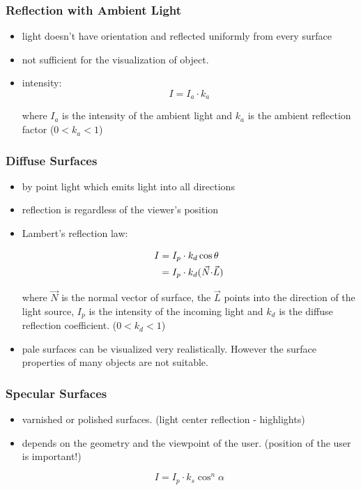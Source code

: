 \documentclass{standalone}
\begin{document}
\subsubsection*{Reflection with Ambient Light}

\begin{itemize}
	\item light doesn't have orientation and reflected uniformly from every surface
	\item not sufficient for the visualization of object.
	\item intensity:
		\begin{equation}
			I = I_a \cdot k_a
		\end{equation}
		
		where $I_a$ is the intensity of the ambient light and $k_a$ is the ambient reflection factor ($0 < k_a < 1$)
\end{itemize}

\subsubsection*{Diffuse Surfaces}

\begin{itemize}
	\item by point light which emits light into all directions
	\item reflection is regardless of the viewer's position
	\item Lambert's reflection law:
		
		\begin{align}
			I &= I_p \cdot k_d \cos{\theta} \\
			&= 	I_p \cdot k_d (\vec{N} \bold{\cdot} \vec{L})
		\end{align}
		
		where $\vec{N}$ is the normal vector of surface, the $\vec{L}$ points into the direction of the light source, $I_p$ is the intensity of the incoming light and $k_d$ is the diffuse reflection coefficient. ($0 < k_d < 1$)
	\item pale surfaces can be visualized very realistically. However the surface properties of many objects are not suitable.
\end{itemize}

\subsubsection*{Specular Surfaces}

\begin{itemize}
	\item varnished or polished surfaces. (light center reflection - highlights)
	\item depends on the geometry and the viewpoint of the user. (position of the user is important!)
	
	\begin{equation}
		I = I_p \cdot k_s \cos^n{\alpha}
	\end{equation}
\end{itemize}
\end{document}

